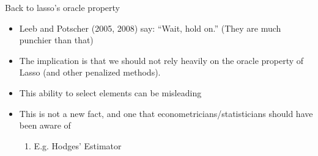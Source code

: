   \begin{frame}[allowframebreaks]{Back to lasso's  oracle property}
        \begin{itemize}
        \item Leeb and Potscher (2005, 2008) say:  ``Wait, hold on.'' (They are much punchier than that)
        \item The implication is that we should not rely heavily on the
          oracle property of Lasso (and other penalized methods).
        \item This ability to select elements can be misleading
        \item This is not a new fact, and one that econometricians/statisticians should have been aware of
          \begin{enumerate}[-]
          \item E.g. Hodges' Estimator
          \end{enumerate}
        \end{itemize}
    \end{frame}
  
